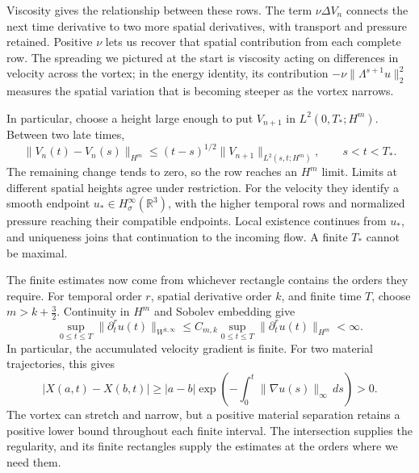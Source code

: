 Viscosity gives the relationship between these rows. The term
\(\nu\Delta V_n\) connects the next time derivative to two more spatial
derivatives, with transport and pressure retained. Positive \(\nu\) lets us
recover that spatial contribution from each complete row. The spreading we
pictured at the start is viscosity acting on differences in velocity across
the vortex; in the energy identity, its contribution
\(-\nu\|\Lambda^{s+1}u\|_2^2\) measures the spatial variation that is
becoming steeper as the vortex narrows.

In particular, choose a height large enough to put \(V_{n+1}\) in
\(L^2(0,T_*;H^m)\). Between two late times,
\[
 \|V_n(t)-V_n(s)\|_{H^m}
 \le(t-s)^{1/2}\|V_{n+1}\|_{L^2(s,t;H^m)},
 \qquad s<t<T_*.
\]
The remaining change tends to zero, so the row reaches an \(H^m\) limit.
Limits at different spatial heights agree under restriction. For the
velocity they identify a smooth endpoint
\(u_*\in H^\infty_\sigma(\mathbb R^3)\), with the higher temporal rows
and normalized pressure reaching their compatible endpoints. Local existence
continues from \(u_*\), and uniqueness joins that continuation to the
incoming flow. A finite \(T_*\) cannot be maximal.

\label{guide:finite-estimates}
The finite estimates now come from whichever rectangle contains the
orders they require. For temporal order \(r\), spatial derivative order
\(k\), and finite time \(T\), choose \(m>k+\tfrac32\). Continuity in
\(H^m\) and Sobolev embedding give
\[
 \sup_{0\le t\le T}\|\partial_t^ru(t)\|_{W^{k,\infty}}
 \le C_{m,k}\sup_{0\le t\le T}\|\partial_t^ru(t)\|_{H^m}<\infty.
\]
In particular, the accumulated velocity gradient is finite. For two material
trajectories, this gives
\[
 |X(a,t)-X(b,t)|\ge |a-b|
 \exp\!\left(-\int_0^t\|\nabla u(s)\|_\infty\,ds\right)>0.
\]
The vortex can stretch and narrow, but a positive material separation
retains a positive lower bound throughout each finite interval. The
intersection supplies the regularity, and its finite rectangles supply
the estimates at the orders where we need them.


